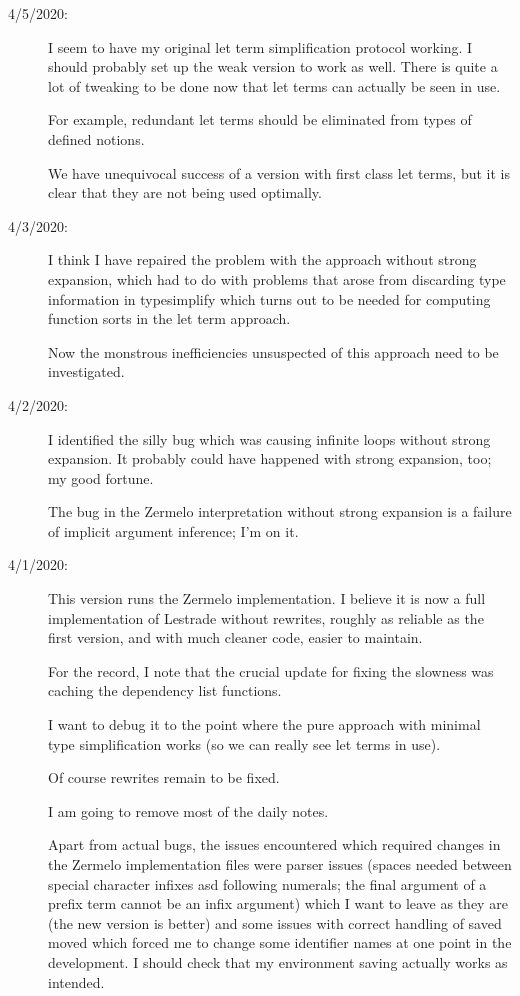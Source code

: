 \documentclass[12pt]{article}
\begin{document}
\begin{description}
\item[4/5/2020:]  I seem to have my original let term simplification protocol working.  I should probably
set up the weak version to work as well.  There is quite a lot of tweaking to be done now that let terms
can actually be seen in use.

For example, redundant let terms should be eliminated from types of defined notions.

We have unequivocal success of a version with first class let terms, but it is clear that they are not being used optimally.

\item[4/3/2020:]  I think I have repaired the problem with the approach without strong expansion,
which had to do with problems that arose from discarding type information in typesimplify which turns
out to be needed for computing function sorts in the let term approach.

Now the monstrous inefficiencies unsuspected of this approach need to be investigated.

\item[4/2/2020:]  I identified the silly bug which was causing infinite loops without strong expansion.  It probably
could have happened with strong expansion, too;  my good fortune.

The bug in the Zermelo interpretation without strong expansion is a failure of implicit argument inference;  I'm on it.

\item[4/1/2020:]  This version runs the Zermelo implementation.  I believe it is now a full implementation of Lestrade without rewrites, roughly
as reliable as the first version, and with much cleaner code, easier to maintain.

For the record, I note that the crucial update for fixing the slowness was caching the dependency list functions.

I want to debug it to the point where the pure approach with minimal type simplification works (so we can really
see let terms in use).

Of course rewrites remain to be fixed.

I am going to remove most of the daily notes.

Apart from actual bugs, the issues encountered which required changes in the Zermelo implementation files were parser issues (spaces needed between special character infixes asd following numerals;  the final argument of a prefix term cannot be an infix argument) which I want to leave as they are (the new version is better) and some issues with
correct handling of saved moved which forced me to change some identifier names at one point in the development.  I should check that my environment saving actually works as intended.


\end{description}
\end{document}
